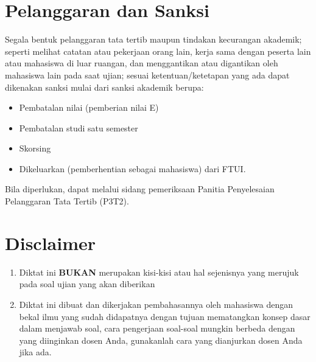 \section{Pelanggaran dan Sanksi}

\par Segala bentuk pelanggaran tata tertib maupun tindakan kecurangan akademik; seperti melihat catatan atau pekerjaan orang lain, kerja sama dengan peserta lain atau mahasiswa di luar ruangan, dan menggantikan atau digantikan oleh mahasiswa lain pada saat ujian; sesuai ketentuan/ketetapan yang ada dapat dikenakan sanksi mulai dari sanksi akademik berupa:
\begin{itemize}[noitemsep]
    \item Pembatalan nilai (pemberian nilai E)
    \item Pembatalan studi satu semester
    \item Skorsing
    \item Dikeluarkan (pemberhentian sebagai mahasiswa) dari FTUI.
\end{itemize}
Bila diperlukan, dapat melalui sidang pemeriksaan Panitia Penyelesaian Pelanggaran
Tata Tertib (P3T2).


\section{Disclaimer}
\begin{enumerate}[label=\Alph*.]
    \item Diktat ini \textbf{BUKAN} merupakan kisi-kisi atau hal sejenisnya yang merujuk pada soal ujian yang akan diberikan
    \item Diktat ini dibuat dan dikerjakan pembahasannya oleh mahasiswa dengan bekal ilmu yang sudah didapatnya dengan tujuan mematangkan konsep dasar dalam menjawab soal, cara pengerjaan soal-soal mungkin berbeda dengan yang diinginkan dosen Anda, gunakanlah cara yang dianjurkan dosen Anda jika ada.
\end{enumerate}


